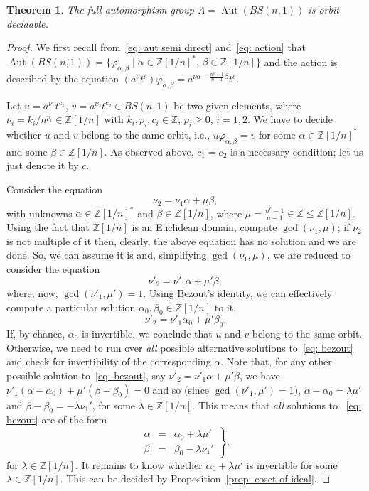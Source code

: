 \documentclass[english]{amsart}
\newtheorem{thm}{Theorem}[section]
\theoremstyle{definition}
\newcommand\ZZ{\mathbb{Z}}
\newcommand{\Aut}{\operatorname{Aut}}
\begin{document}
\begin{thm}\label{thm: main 1 OD}
The full automorphism group $A=\Aut(BS(n,1))$ is orbit decidable.
\end{thm}

\begin{proof}
We first recall from~\eqref{eq: aut semi direct} and~\eqref{eq: action} that $\Aut(BS(n,1))=\{ \varphi_{\alpha, \beta} \mid \alpha\in \ZZ[1/n]^*,\, \beta\in \ZZ[1/n]\}$ and the action is described by the equation $(a^\nu t^c)\varphi_{\alpha, \beta} = a^{\nu \alpha + \frac{n^{c}-1}{n-1}\beta}t^{c}$.

Let $u=a^{\nu_1}t^{c_1},\, v=a^{\nu_2}t^{c_2}\in BS(n,1)$ be two given elements, where $\nu_i =k_i/n^{p_i}\in \ZZ[1/n]$ with $k_i, p_i, c_i\in \ZZ$, $p_i\geq 0$, $i=1,2$. We have to decide whether $u$ and $v$ belong to the same orbit, i.e., $u\varphi_{\alpha, \beta} =v$ for some $\alpha\in \ZZ[1/n]^*$ and some $\beta\in \ZZ[1/n]$. As observed above, $c_1 =c_2$ is a necessary condition; let us just denote it by $c$. 

Consider the equation 
 $$
\nu_2 =\nu_1 \alpha +\mu\beta, 
 $$
with unknowns $\alpha \in \ZZ[1/n]^*$ and $\beta \in \ZZ[1/n]$, where $\mu =\frac{n^c -1}{n-1}\in \ZZ \leq\ZZ[1/n]$. Using the fact that $\ZZ[1/n]$ is an Euclidean domain, compute $\gcd(\nu_1, \mu)$; if $\nu_2$ is not multiple of it then, clearly, the above equation has no solution and we are done. So, we can assume it is and, simplifying $\gcd(\nu_1, \mu)$, we are reduced to consider the equation  
 \begin{equation}\label{eq: bezout}
\nu'_2 =\nu'_1 \alpha +\mu'\beta, 
 \end{equation}
where, now, $\gcd(\nu'_1, \mu')=1$. Using Bezout's identity, we can effectively compute a particular solution $\alpha_0,\beta_0\in \ZZ[1/n]$ to it, 
 $$
\nu'_2 =\nu'_1 \alpha_0 +\mu'\beta_0. 
 $$
If, by chance, $\alpha_0$ is invertible, we conclude that $u$ and $v$ belong to the same orbit. Otherwise, we need to run over \emph{all} possible alternative solutions to~\eqref{eq: bezout} and check for invertibility of the corresponding $\alpha$. Note that, for any other possible solution to~\eqref{eq: bezout}, say $\nu'_2 =\nu'_1 \alpha +\mu'\beta$, we have $\nu'_1 (\alpha-\alpha_0 )+\mu' (\beta-\beta_0 )=0$ and so (since $\gcd(\nu'_1, \mu')=1$), $\alpha-\alpha_0 =\lambda \mu'$ and $\beta-\beta_0 =-\lambda \nu_1'$, for some $\lambda\in \ZZ[1/n]$. This means that \emph{all} solutions to ~\eqref{eq: bezout} are of the form 
 $$
\left. \begin{array}{rcl} \alpha & = & \alpha_0+\lambda \mu' \\ \beta & = & \beta_0 -\lambda \nu_1' \end{array} \right\},
 $$
for $\lambda\in \ZZ[1/n]$. It remains to know whether $\alpha_0+\lambda \mu'$ is invertible for some $\lambda\in \ZZ[1/n]$. This can be decided by Proposition~\ref{prop: coset of ideal}. 
\end{proof}
\end{document}
